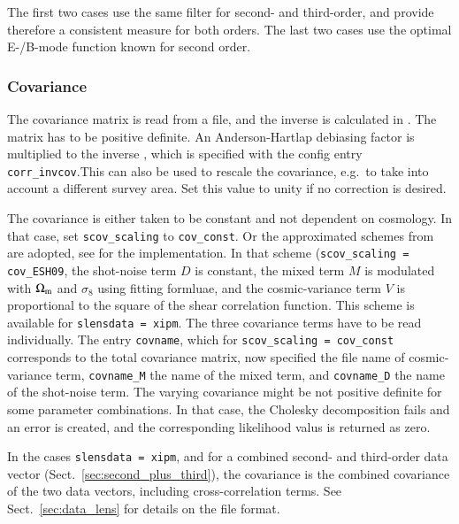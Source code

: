 \documentclass[11pt, chapterprefix, headsepline]{scrartcl}
\begin{document}
The first two cases use the same filter for second- and third-order,
and provide therefore a consistent measure for both orders. The last
two cases use the optimal E-/B-mode function known for second order.


\subsubsection{Covariance}

The covariance matrix is read from a file, and the inverse is
calculated in \CosmoPMC. The matrix has to be positive definite.  An
Anderson-Hartlap debiasing factor is multiplied to the inverse
\citep{andersen03, HSS07}, which
is specified with the config entry \texttt{corr\_invcov}.This can also
be used to rescale the covariance, e.g.~to take into account a
different survey area. Set this value to unity if no correction is
desired.

The covariance is either taken to be constant and not dependent on cosmology.
In that case, set \texttt{scov\_scaling} to \texttt{cov\_const}. Or the
approximated schemes from \cite{2009A&A...502..721E} are adopted, see
\cite{CFHTLenS-2pt-notomo} for the implementation. In that scheme
(\texttt{scov\_scaling = cov\_ESH09}, the shot-noise term $D$ is constant, the
mixed term $M$ is modulated with $\Omega_{\rm m}$ and $\sigma_8$ using fitting
formluae, and the cosmic-variance term $V$ is proportional to the square of the
shear correlation function. This scheme is available for \texttt{slensdata =
xipm}. The three covariance terms have to be read individually. The entry
\texttt{covname}, which for \texttt{scov\_scaling = cov\_const} corresponds to
the total covariance matrix, now specified the file name of cosmic-variance
term, \texttt{covname\_M} the name of the mixed term, and \texttt{covname\_D}
the name of the shot-noise term. The varying covariance might be not positive
definite for some parameter combinations. In that case, the Cholesky
decomposition fails and an error is created, and the corresponding likelihood
valus is returned as zero.

In the cases \texttt{slensdata = xipm}, and for a combined second- and
third-order data vector (Sect.\ \ref{sec:second_plus_third}), the covariance is
the combined covariance of the two data vectors, including cross-correlation
terms. See Sect.~\ref{sec:data_lens} for details on the file format.
\end{document}
